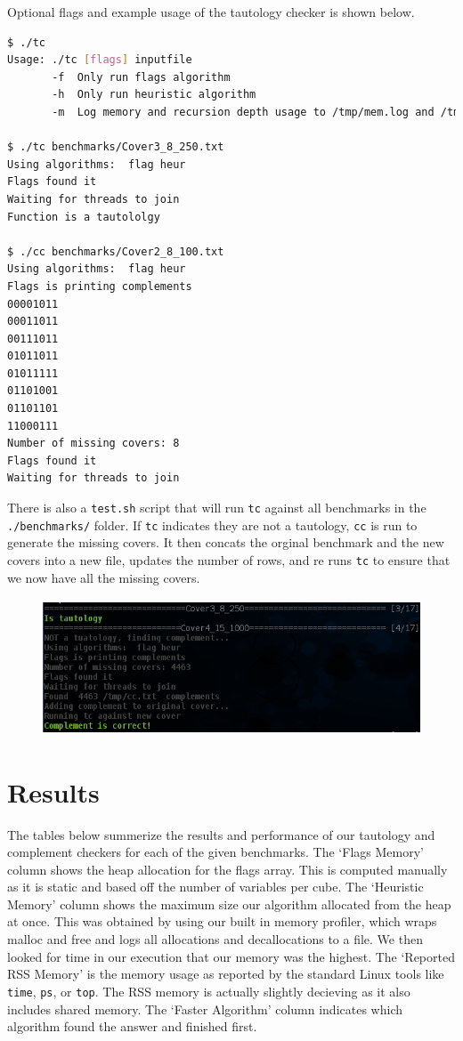 \documentclass[10pt]{article}
\begin{document}
Optional flags and example usage of the tautology checker is shown below.
\begin{lstlisting}[language=bash]
$ ./tc
Usage: ./tc [flags] inputfile
       -f  Only run flags algorithm
       -h  Only run heuristic algorithm
       -m  Log memory and recursion depth usage to /tmp/mem.log and /tmp/dep.log

$ ./tc benchmarks/Cover3_8_250.txt
Using algorithms:  flag heur
Flags found it
Waiting for threads to join
Function is a tautololgy

$ ./cc benchmarks/Cover2_8_100.txt
Using algorithms:  flag heur
Flags is printing complements
00001011
00011011
00111011
01011011
01011111
01101001
01101101
11000111
Number of missing covers: 8
Flags found it
Waiting for threads to join

\end{lstlisting}

There is also a \texttt{test.sh} script that will run \texttt{tc} against all
benchmarks in the \texttt{./benchmarks/} folder. If \texttt{tc} indicates they
are not a tautology, \texttt{cc} is run to generate the missing covers. It then
concats the orginal benchmark and the new covers into a new file, updates the
number of rows, and re runs \texttt{tc} to ensure that we now have all the
missing covers.

\begin{figure}[H]
    \centering
    \includegraphics[height=1.6in]{./test.png}
\end{figure}

\newpage
\section{Results}

    The tables below summerize the results and performance of our tautology and
    complement checkers for each of the given benchmarks. The `Flags Memory'
    column shows the heap allocation for the flags array. This is computed
    manually as it is static and based off the number of variables per cube.
    The `Heuristic Memory' column shows the maximum size our algorithm
    allocated from the heap at once.  This was obtained by using our built in
    memory profiler, which wraps malloc and free and logs all allocations and
    decallocations to a file. We then looked for time in our execution that our
    memory was the highest. The `Reported RSS Memory' is the memory usage as
    reported by the standard Linux tools like \texttt{time}, \texttt{ps}, or
    \texttt{top}. The RSS memory is actually slightly decieving as it also
    includes shared memory. The `Faster Algorithm' column indicates which
    algorithm found the answer and finished first.
\end{document}
